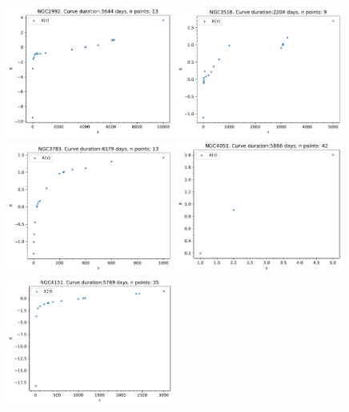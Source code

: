 \begin{figure}
\begin{center}
    {
  \includegraphics[width=0.49\textwidth]{Figs/Chapter5/X_tau_NGC2992.pdf}  \hfill
  \includegraphics[width=0.49\textwidth]{Figs/Chapter5/X_tau_NGC3516.pdf} \\
  \includegraphics[width=0.49\textwidth]{Figs/Chapter5/X_tau_NGC3783.pdf} \hfill 
  \includegraphics[width=0.49\textwidth]{Figs/Chapter5/X_tau_NGC4051.pdf}  \\ 
  \includegraphics[width=0.49\textwidth]{Figs/Chapter5/X_tau_NGC4151.pdf}  \hfill
}
\end{center}
\end{figure}
